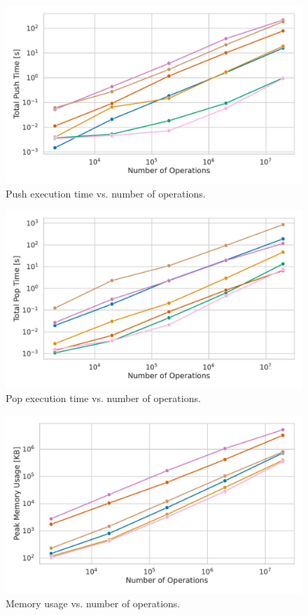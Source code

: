 \begin{figure}[H]
    \centering
    \includegraphics[width=1.0\textwidth]{figures/plots/plot_bulk_push.pdf}
    \caption{Push execution time vs. number of operations.}
\end{figure}

\begin{figure}[H]
    \centering
    \includegraphics[width=1.0\textwidth]{figures/plots/plot_bulk_pop.pdf}
    \caption{Pop execution time vs. number of operations.}
\end{figure}

\begin{figure}[H]
    \centering
    \includegraphics[width=1.0\textwidth]{figures/plots/plot_bulk_memory.pdf}
    \caption{Memory usage vs. number of operations.}
\end{figure}


